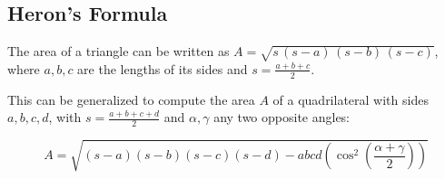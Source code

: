 \subsection{Heron's Formula}

The area of a triangle can be written as $A = \sqrt{s\,(s-a)\,(s-b)\,(s-c)}$, where $a, b, c$ are the lengths of its sides and $s = \frac{a+b+c}{2}$.

This can be generalized to compute the area $A$ of a quadrilateral with sides $a, b, c, d$, with $s = \frac{a+b+c+d}{2}$ and $\alpha, \gamma$ any two opposite angles:

$$ A = \sqrt{(s-a)(s-b)(s-c)(s-d) - abcd\left( \cos ^2 \left( \frac{\alpha+\gamma}{2} \right) \right)} $$

